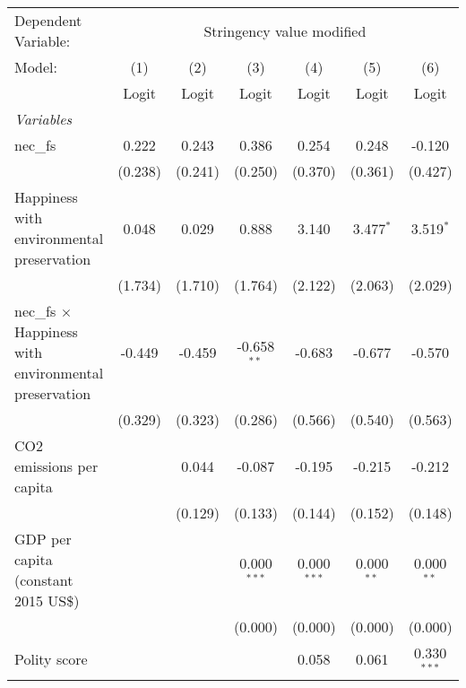 
\begingroup
\centering
\begin{tabular}{lcccccc}
   \toprule
   Dependent Variable: & \multicolumn{6}{c}{Stringency value modified}\\
   Model:                                                       & (1)     & (2)     & (3)           & (4)           & (5)          & (6)\\  
                                                                &  Logit  & Logit   & Logit         & Logit         & Logit        & Logit\\  
   \midrule
   \emph{Variables}\\
   nec\_fs                                                      & 0.222   & 0.243   & 0.386         & 0.254         & 0.248        & -0.120\\   
                                                                & (0.238) & (0.241) & (0.250)       & (0.370)       & (0.361)      & (0.427)\\   
   Happiness with environmental preservation                    & 0.048   & 0.029   & 0.888         & 3.140         & 3.477$^{*}$  & 3.519$^{*}$\\   
                                                                & (1.734) & (1.710) & (1.764)       & (2.122)       & (2.063)      & (2.029)\\   
   nec\_fs $\times$ Happiness with environmental preservation   & -0.449  & -0.459  & -0.658$^{**}$ & -0.683        & -0.677       & -0.570\\   
                                                                & (0.329) & (0.323) & (0.286)       & (0.566)       & (0.540)      & (0.563)\\   
   CO2 emissions per capita                                     &         & 0.044   & -0.087        & -0.195        & -0.215       & -0.212\\   
                                                                &         & (0.129) & (0.133)       & (0.144)       & (0.152)      & (0.148)\\   
   GDP per capita (constant 2015 US\$)                          &         &         & 0.000$^{***}$ & 0.000$^{***}$ & 0.000$^{**}$ & 0.000$^{**}$\\   
                                                                &         &         & (0.000)       & (0.000)       & (0.000)      & (0.000)\\   
   Polity score                                                 &         &         &               & 0.058         & 0.061        & 0.330$^{***}$\\   

\end{tabular}
